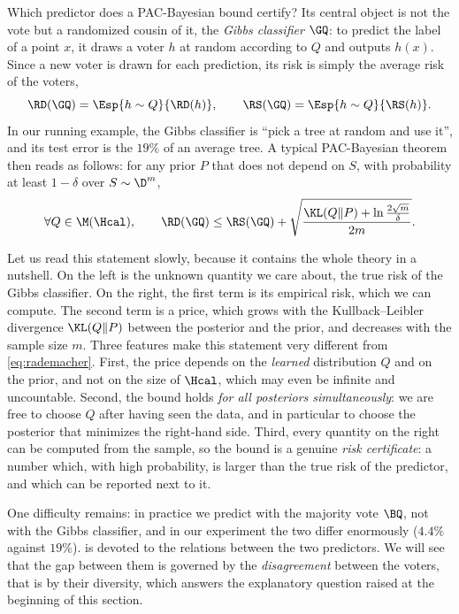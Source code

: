 Which predictor does a PAC-Bayesian bound certify? Its central object is not
the vote but a randomized cousin of it, the \emph{Gibbs classifier} $\GQ$: to
predict the label of a point $x$, it draws a voter $h$ at random according to
$Q$ and outputs $h(x)$. Since a new voter is drawn for each prediction, its risk
is simply the average risk of the voters,
\[
  \RD(\GQ)=\Esp{h\sim Q}{\RD(h)},\qquad \RS(\GQ)=\Esp{h\sim Q}{\RS(h)}.
\]
In our running example, the Gibbs classifier is ``pick a tree at random and use
it'', and its test error is the $19\%$ of an average tree. A typical PAC-Bayesian
theorem \citep[in the form of \citealp{maurer2004note}]{mcallester1999some} then
reads as follows: for any prior $P$ that does not depend on $S$, with probability
at least $1-\delta$ over $S\sim\D^m$,
\begin{equation}\label{eq:mcall_intro}
  \forall Q\in\M(\Hcal),\qquad
  \RD(\GQ)\leq \RS(\GQ)+\sqrt{\frac{\KL(Q\|P)+\ln\frac{2\sqrt m}{\delta}}{2m}}.
\end{equation}

Let us read this statement slowly, because it contains the whole theory in a
nutshell. On the left is the unknown quantity we care about, the true risk of the
Gibbs classifier. On the right, the first term is its empirical risk, which we can
compute. The second term is a price, which grows with the Kullback--Leibler
divergence $\KL(Q\|P)$ between the posterior and the prior, and decreases with
the sample size $m$. Three features make this statement very different from
\eqref{eq:rademacher}. First, the price depends on the \emph{learned}
distribution $Q$ and on the prior, and not on the size of $\Hcal$, which may even
be infinite and uncountable. Second, the bound holds \emph{for all posteriors
simultaneously}: we are free to choose $Q$ after having seen the data, and in
particular to choose the posterior that minimizes the right-hand side. Third,
every quantity on the right can be computed from the sample, so the bound is a
genuine \emph{risk certificate}: a number which, with high probability, is larger
than the true risk of the predictor, and which can be reported next to it.

One difficulty remains: in practice we predict with the majority vote $\BQ$, not
with the Gibbs classifier, and in our experiment the two differ enormously ($4.4\%$
against $19\%$).  is devoted to the relations between the two
predictors. We will see that the gap between them is governed by the
\emph{disagreement} between the voters, that is by their diversity, which
answers the explanatory question raised at the beginning of this section.

